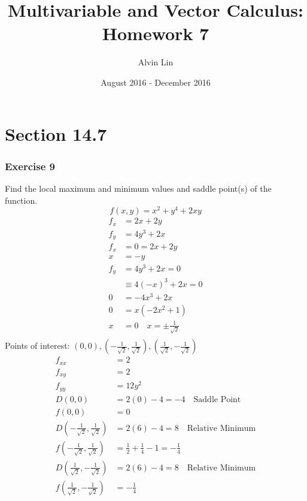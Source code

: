 \documentclass{math}
\title{Multivariable and Vector Calculus: Homework 7}
\author{Alvin Lin}
\date{August 2016 - December 2016}
\begin{document}
\maketitle

\section*{Section 14.7}

\subsubsection*{Exercise 9}
Find the local maximum and minimum values and saddle point(s) of the function.
\[ f(x,y) = x^2+y^4+2xy \]
\begin{align*}
  f_x &= 2x+2y \\
  f_y &= 4y^3+2x \\
  f_x &= 0 = 2x+2y \\
  x &= -y \\
  f_y &= 4y^3+2x = 0 \\
  &\equiv 4(-x)^3+2x = 0 \\
  0 &= -4x^3+2x \\
  0 &= x(-2x^2+1) \\
  x &= 0 \quad x = \pm\frac{1}{\sqrt{2}} \\
\end{align*}
Points of interest: \( (0,0), (-\frac{1}{\sqrt{2}},\frac{1}{\sqrt{2}}),
(\frac{1}{\sqrt{2}},-\frac{1}{\sqrt{2}}) \)
\begin{align*}
  f_{xx} &= 2 \\
  f_{xy} &= 2 \\
  f_{yy} &= 12y^2 \\
  D(0,0) &= 2(0)-4 = -4 \quad \text{Saddle Point}\\
  f(0,0) &= 0 \\
  D(-\frac{1}{\sqrt{2}},\frac{1}{\sqrt{2}}) &= 2(6)-4 = 8
    \quad \text{Relative Minimum}\\
  f(-\frac{1}{\sqrt{2}},\frac{1}{\sqrt{2}}) &= \frac{1}{2}+\frac{1}{4}-1 =
    -\frac{1}{4} \\
  D(\frac{1}{\sqrt{2}},-\frac{1}{\sqrt{2}}) &= 2(6)-4 = 8
    \quad \text{Relative Minimum} \\
  f(\frac{1}{\sqrt{2}},-\frac{1}{\sqrt{2}}) &= -\frac{1}{4}
\end{align*}
\end{document}
